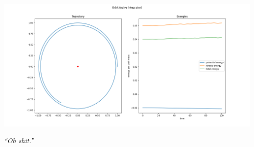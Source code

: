 
\begin{frame}
%
\includegraphics[width=\linewidth]{./gfx/07-orbital-mechanics}

\begin{center}
\emph{\enquote{Oh shit.}}
\end{center}
%
\end{frame}


